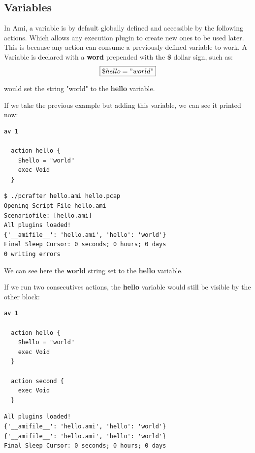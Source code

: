 \documentclass[10pt]{article}
\begin{document}
\subsection{Variables}

In Ami, a variable is by default globally defined and accessible by the following actions. Which allows any execution plugin to create new ones to be used later. This is because any action can consume a previously defined variable to work. A Variable is declared with a \textbf{word} prepended with the \textbf{\$} dollar sign, such as:
\begin{equation}
  \boxed{\$hello = "world"}
\end{equation}

would set the string "world" to the \textbf{hello} variable.

If we take the previous example but adding this variable, we can see it printed now:
\begin{lstlisting}[caption={Hello world with a variable},captionpos=b]
  av 1

  action hello {
    $hello = "world"
    exec Void
  }
\end{lstlisting}

\begin{lstlisting}[caption={Running our example},captionpos=b]
$ ./pcrafter hello.ami hello.pcap
Opening Script File hello.ami
Scenariofile: [hello.ami]
All plugins loaded!
{'__amifile__': 'hello.ami', 'hello': 'world'}
Final Sleep Cursor: 0 seconds; 0 hours; 0 days
0 writing errors
\end{lstlisting}

We can see here the \textbf{world} string set to the \textbf{hello} variable.

If we run two consecutives actions, the \textbf{hello} variable would still be visible by the other block:
\begin{lstlisting}[caption={Hello world with a variable  and two action blocks},captionpos=b]
  av 1

  action hello {
    $hello = "world"
    exec Void
  }

  action second {
    exec Void
  }
\end{lstlisting}

\begin{lstlisting}[caption={Printing variables for each action},captionpos=b]
All plugins loaded!
{'__amifile__': 'hello.ami', 'hello': 'world'}
{'__amifile__': 'hello.ami', 'hello': 'world'}
Final Sleep Cursor: 0 seconds; 0 hours; 0 days
\end{lstlisting}
\end{document}
